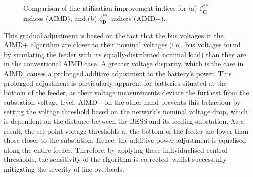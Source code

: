 \begin{figure}\centering
 \caption{Comparison of line utilisation improvement indices for (a) $\zeta_\textbf{C}^{**}$ indices (AIMD), and (b) $\zeta_\textbf{D}^{**}$ indices (AIMD+).}
 \label{fig-utilisation-comparison-large}
\end{figure}

This gradual adjustment is based on the fact that the bus voltages in the AIMD+ algorithm are closer to their nominal voltages (i.e., bus voltages found by simulating the feeder with its equally-distributed nominal load) than they are in the conventional AIMD case. A greater voltage disparity, which is the case in AIMD, causes a prolonged additive adjustment to the battery's power. This prolonged adjustment is particularly apparent for batteries situated at the bottom of the feeder, as their voltage measurements deviate the furthest from the substation voltage level. AIMD+ on the other hand prevents this behaviour by setting the voltage threshold based on the network's nominal voltage drop, which is dependent on the distance between the BESS and its feeding substation. As a result, the set-point voltage thresholds at the bottom of the feeder are lower than those closer to the substation. Hence, the additive power adjustment is equalised along the entire feeder. Therefore, by applying these individualised control thresholds, the sensitivity of the algorithm is corrected, whilst successfully mitigating the severity of line overloads.

